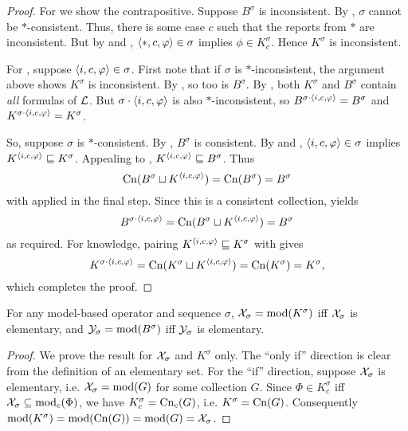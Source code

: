 \begin{proof}
    For \condcons{} we show the contrapositive. Suppose $B^\sigma$ is
    inconsistent. By \consistency{}, $\sigma$ cannot be $\ast$-consistent.
    Thus, there is some case $c$ such that the reports from $\ast$ are
    inconsistent. But by \soundness{} and \closure{}, $\langle {\ast, c, \varphi} \rangle
    \in \sigma$ implies $\phi \in K^\sigma_c$. Hence $K^\sigma$ is
    inconsistent.

    For \duprem{}, suppose $\langle {i, c, \varphi} \rangle \in \sigma$. First note that if
    $\sigma$ is $\ast$-inconsistent, the argument above shows $K^\sigma$ is
    inconsistent. By \containment{}, so too is $B^\sigma$. By \closure{}, both
    $K^\sigma$ and $B^\sigma$ contain \emph{all} formulas of $\mathcal{L}{}$. But
    $\sigma \cdot \langle {i, c, \varphi} \rangle$ is also $\ast$-inconsistent, so
    $B^{\sigma \cdot \langle {i, c, \varphi} \rangle} = B^\sigma$ and $K^{\sigma \cdot
    \langle {i, c, \varphi} \rangle} = K^\sigma$.

    So, suppose $\sigma$ is $\ast$-consistent. By \consistency{}, $B^\sigma$ is
    consistent. By \rearr{} and \kconj{}, $\langle {i, c, \varphi} \rangle \in \sigma$
    implies $K^{\langle {i, c, \varphi} \rangle} \sqsubseteq K^\sigma$. Appealing to
    \containment{}, $K^{\langle {i, c, \varphi} \rangle} \sqsubseteq B^\sigma$. Thus
    \[
        \operatorname{Cn}(B^\sigma \sqcup K^{\langle {i, c, \varphi} \rangle})
        = \operatorname{Cn}(B^\sigma)
        = B^\sigma
    \]
    with \closure{} applied in the final step. Since this is a consistent
    collection, \incvac{} yields
    \[
        B^{\sigma \cdot \langle {i, c, \varphi} \rangle}
        = \operatorname{Cn}(B^\sigma \sqcup K^{\langle {i, c, \varphi} \rangle})
        = B^\sigma
    \]
    as required. For knowledge, pairing $K^{\langle {i, c, \varphi} \rangle} \sqsubseteq
    K^\sigma$ with \kconj{} gives
    \[
        K^{\sigma \cdot \langle {i, c, \varphi} \rangle}
        = \operatorname{Cn}(K^\sigma \sqcup K^{\langle {i, c, \varphi} \rangle})
        = \operatorname{Cn}(K^\sigma)
        = K^\sigma,
    \]
    which completes the proof.
\end{proof}

\begin{lemma}
\label{kr_lemma_model_based_elementary}
    For any model-based operator and sequence $\sigma$, $\mathcal{X}_\sigma =
    \operatorname{mod}(K^\sigma)$ iff $\mathcal{X}_\sigma$ is elementary, and $\mathcal{Y}_\sigma =
    \operatorname{mod}(B^\sigma)$ iff $\mathcal{Y}_\sigma$ is elementary.
\end{lemma}

\begin{proof}
We prove the result for $\mathcal{X}_\sigma$ and $K^\sigma$ only. The ``only if''
direction is clear from the definition of an elementary set. For the ``if''
direction, suppose $\mathcal{X}_\sigma$ is elementary, i.e. $\mathcal{X}_\sigma = \operatorname{mod}(G)$ for
some collection $G$. Since $\Phi \in K^\sigma_c$ iff $\mathcal{X}_\sigma \subseteq
\operatorname{mod}_c(\Phi)$, we have $K^\sigma_c = \operatorname{Cn}_c(G)$, i.e. $K^\sigma = \operatorname{Cn}(G)$.
Consequently $\operatorname{mod}(K^\sigma) = \operatorname{mod}(\operatorname{Cn}(G)) = \operatorname{mod}(G) = \mathcal{X}_\sigma$.
\end{proof}


